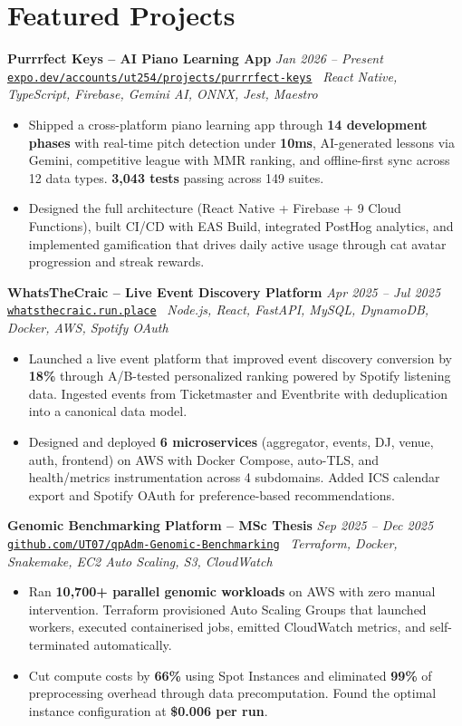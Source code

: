 \documentclass[10pt,a4paper]{article}
\newcommand{\projectentryurl}[5]{%
  \Needspace{3\baselineskip}%
  \textbf{#1} \hfill \textit{#2}\\[-0.15em]
  {\small\href{#3}{\texttt{#4}}} \textbar\ \textit{#5}\\[-0.25em]
}
\begin{document}
\section*{Featured Projects}
\projectentryurl{Purrrfect Keys -- AI Piano Learning App}{Jan 2026 -- Present}{https://expo.dev/accounts/ut254/projects/purrrfect-keys/builds/229bd252-c684-4af5-b39f-4f3623455a7e}{expo.dev/accounts/ut254/projects/purrrfect-keys}{React Native, TypeScript, Firebase, Gemini AI, ONNX, Jest, Maestro}
\begin{itemize}
  \item Shipped a cross-platform piano learning app through \textbf{14 development phases} with real-time pitch detection under \textbf{10ms}, AI-generated lessons via Gemini, competitive league with MMR ranking, and offline-first sync across 12 data types. \textbf{3,043 tests} passing across 149 suites.
  \item Designed the full architecture (React Native + Firebase + 9 Cloud Functions), built CI/CD with EAS Build, integrated PostHog analytics, and implemented gamification that drives daily active usage through cat avatar progression and streak rewards.
\end{itemize}
\vspace{0.20em}
\projectentryurl{WhatsTheCraic -- Live Event Discovery Platform}{Apr 2025 -- Jul 2025}{https://github.com/UT07/whatsthecraic}{whatsthecraic.run.place}{Node.js, React, FastAPI, MySQL, DynamoDB, Docker, AWS, Spotify OAuth}
\begin{itemize}
  \item Launched a live event platform that improved event discovery conversion by \textbf{18\%} through A/B-tested personalized ranking powered by Spotify listening data. Ingested events from Ticketmaster and Eventbrite with deduplication into a canonical data model.
  \item Designed and deployed \textbf{6 microservices} (aggregator, events, DJ, venue, auth, frontend) on AWS with Docker Compose, auto-TLS, and health/metrics instrumentation across 4 subdomains. Added ICS calendar export and Spotify OAuth for preference-based recommendations.
\end{itemize}
\vspace{0.20em}
\projectentryurl{Genomic Benchmarking Platform -- MSc Thesis}{Sep 2025 -- Dec 2025}{https://github.com/UT07/Performance-Optimization-and-Cost-Analysis-of-qpAdm-Genomic-Modeling}{github.com/UT07/qpAdm-Genomic-Benchmarking}{Terraform, Docker, Snakemake, EC2 Auto Scaling, S3, CloudWatch}
\begin{itemize}
  \item Ran \textbf{10,700+ parallel genomic workloads} on AWS with zero manual intervention. Terraform provisioned Auto Scaling Groups that launched workers, executed containerised jobs, emitted CloudWatch metrics, and self-terminated automatically.
  \item Cut compute costs by \textbf{66\%} using Spot Instances and eliminated \textbf{99\%} of preprocessing overhead through data precomputation. Found the optimal instance configuration at \textbf{\$0.006 per run}.
\end{itemize}
\end{document}
